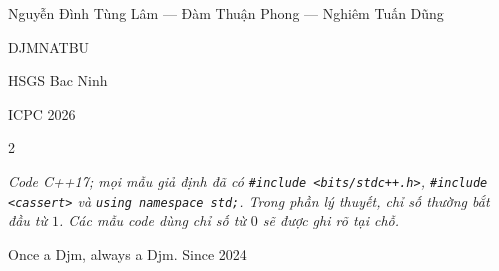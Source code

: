 \documentclass[a4paper,landscape,10pt]{article}
\begin{document}
\begin{titlepage}
\thispagestyle{empty}
\centering
{\normalsize Nguyễn Đình Tùng Lâm — Đàm Thuận Phong — Nghiêm Tuấn Dũng\par}
\vfill
{\coverfont\fontsize{150}{150}\selectfont DJMNATBU\par}
\vspace{6mm}
{\normalsize HSGS Bac Ninh\par}
\vfill
{\normalsize ICPC 2026\par}
\end{titlepage}
\begingroup
\small
\begin{multicols}{2}
\tableofcontents
\end{multicols}
\endgroup
\noindent\textit{Code C++17; mọi mẫu giả định đã có
\texttt{\#include <bits/stdc++.h>}, \texttt{\#include <cassert>}
và \texttt{using namespace std;}.
Trong phần lý thuyết, chỉ số thường bắt đầu từ $1$.
Các mẫu code dùng chỉ số từ $0$ sẽ được ghi rõ tại chỗ.}
\clearpage














\clearpage
\thispagestyle{empty}
\null\vfill
\begin{center}
Once a Djm, always a Djm. Since 2024
\end{center}
\vfill\null
\end{document}
